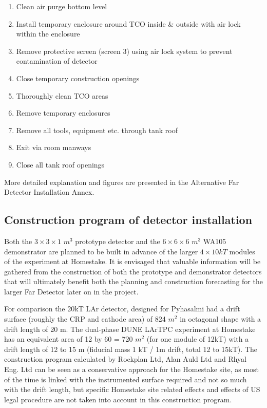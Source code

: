 \begin{enumerate}
\item{Clean air purge bottom level}
\item{Install temporary enclosure around TCO inside \& outside with air lock within the enclosure}
\item{ Remove protective screen (screen 3) using air lock system to prevent contamination of detector}
\item{Close temporary construction openings}
\item{Thoroughly clean TCO areas}
\item{Remove temporary enclosures}
\item{Remove all tools, equipment etc. through tank roof}
\item{Exit via room manways}
\item{Close all tank roof openings}
\end{enumerate}
More detailed explanation and figures are presented in the Alternative
Far Detector Installation Annex.

\subsection{Construction program of detector installation}


Both the $3\times3\times1$ $m^3$ prototype detector and the $6\times
6\times 6$ $m^3$ WA105 demonstrator are planned to be built in advance
of the larger $4\times 10kT$ modules of the experiment at Homestake.
It is envisaged that valuable information will be gathered from the
construction of both the prototype and demonstrator detectors that
will ultimately benefit both the planning and construction forecasting
for the larger Far Detector later on in the project.

For comparison the 20kT LAr detector, designed for Pyhasalmi had a
drift surface (roughly the CRP and cathode area) of 824 $m^2$ in
octagonal shape with a drift length of 20 m. The dual-phase DUNE LArTPC
experiment at Homestake has an equivalent area of 12 by 60 = 720 $m^2$
(for one module of 12kT) with a drift length of 12 to 15 m (fiducial
mass 1 kT / 1m drift, total 12 to 15kT). The construction program
calculated by Rockplan Ltd, Alan Auld Ltd and Rhyal Eng. Ltd can be
seen as a conservative approach for the Homestake site, as most of the
time is linked with the instrumented surface required and not so much
with the drift length, but specific Homestake site related effects and
effects of US legal procedure are not taken into account in this
construction program.

